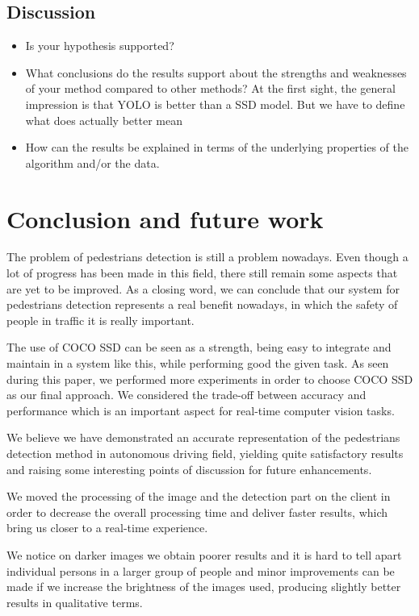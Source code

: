 \documentclass[runningheads,a4paper,11pt]{report}
\begin{document}
\section{Discussion}
\label{section:discussion}

\begin{itemize}
	\item Is your hypothesis supported? 
	\item What conclusions do the results support about the strengths and weaknesses of your method compared to other methods? 
	At the first sight, the general impression is that YOLO is better than a SSD model. But we have to define what does actually better mean 
	\item How can the results be explained in terms of the underlying properties of the algorithm and/or the data. 
\end{itemize}


\chapter{Conclusion and future work}
\label{chapter:concl}
The problem of pedestrians detection is still a problem nowadays. Even though
a lot of progress has been made in this field,  there still remain some aspects that are yet to be improved.
As a closing word, we can conclude that our system for pedestrians detection represents a real benefit nowadays, in which the safety of people in traffic it is really important.

The use of COCO SSD can be seen as a strength, being easy to integrate and maintain in a system like this, while performing good the given task. As seen during this paper, we performed more experiments in order to choose COCO SSD as our final approach. We considered the trade-off between accuracy and performance which is an important aspect for real-time computer vision tasks.
 
We believe we have demonstrated an accurate representation of the pedestrians detection method in autonomous driving field, yielding quite satisfactory results and raising some interesting points of discussion for future enhancements.

We moved the processing of the image and the detection part on the client in order to decrease the overall processing time and deliver faster results, which bring us closer to a real-time experience.

We notice on darker images we obtain poorer results and it is hard to tell apart individual persons in a larger group of people and minor improvements can be made if we increase the brightness of the images used, producing slightly better results in qualitative terms.
\end{document}
